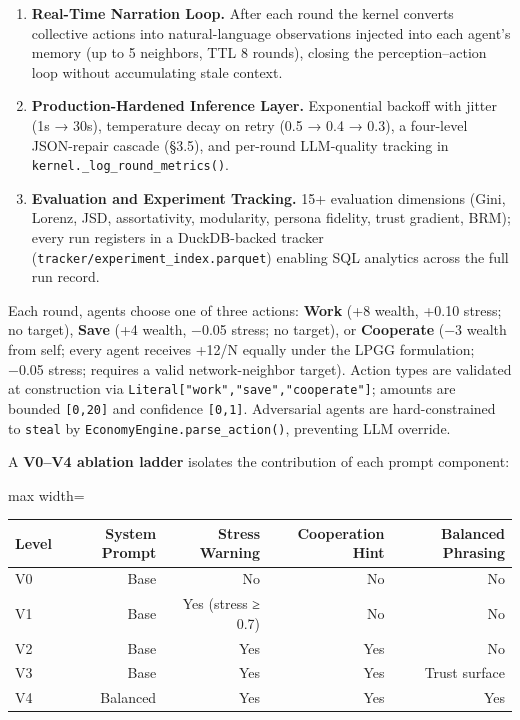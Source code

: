 \begin{enumerate}
\item \textbf{Real-Time Narration Loop.} After each round the kernel converts collective actions into natural-language observations injected into each agent's memory (up to 5 neighbors, TTL 8 rounds), closing the perception–action loop without accumulating stale context.
\item \textbf{Production-Hardened Inference Layer.} Exponential backoff with jitter (1s → 30s), temperature decay on retry (0.5 → 0.4 → 0.3), a four-level JSON-repair cascade (§3.5), and per-round LLM-quality tracking in \texttt{kernel.\_log\_round\_metrics()}.
\item \textbf{Evaluation and Experiment Tracking.} 15+ evaluation dimensions (Gini, Lorenz, JSD, assortativity, modularity, persona fidelity, trust gradient, BRM); every run registers in a DuckDB-backed tracker (\texttt{tracker/experiment\_index.parquet}) enabling SQL analytics across the full run record.
\end{enumerate}


Each round, agents choose one of three actions: \textbf{Work} (+8 wealth, +0.10 stress; no target), \textbf{Save} (+4 wealth, −0.05 stress; no target), or \textbf{Cooperate} (−3 wealth from self; every agent receives +12/N equally under the LPGG formulation; −0.05 stress; requires a valid network-neighbor target). Action types are validated at construction via \texttt{Literal["work","save","cooperate"]}; amounts are bounded \texttt{[0,20]} and confidence \texttt{[0,1]}. Adversarial agents are hard-constrained to \texttt{steal} by \texttt{EconomyEngine.parse\_action()}, preventing LLM override.


A \textbf{V0–V4 ablation ladder} isolates the contribution of each prompt component:

\begin{table}[H]
\centering
\footnotesize
\begin{adjustbox}{max width=\textwidth}
\begin{tabular}{lrrrr}
\toprule
Level & System Prompt & Stress Warning & Cooperation Hint & Balanced Phrasing \\
\midrule
V0 & Base & No & No & No \\
V1 & Base & Yes (stress ≥ 0.7) & No & No \\
V2 & Base & Yes & Yes & No \\
V3 & Base & Yes & Yes & Trust surface \\
V4 & Balanced & Yes & Yes & Yes \\
\bottomrule
\end{tabular}
\end{adjustbox}
\end{table}

